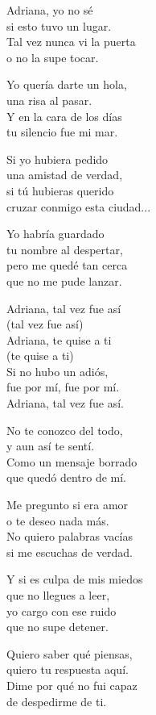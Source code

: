\begin{lyrics}
Adriana, yo no sé\\
si esto tuvo un lugar.\\
Tal vez nunca vi la puerta\\
o no la supe tocar.

Yo quería darte un hola,\\
una risa al pasar.\\
Y en la cara de los días\\
tu silencio fue mi mar.

Si yo hubiera pedido\\
una amistad de verdad,\\
si tú hubieras querido\\
cruzar conmigo esta ciudad...

Yo habría guardado\\
tu nombre al despertar,\\
pero me quedé tan cerca\\
que no me pude lanzar.

Adriana, tal vez fue así\\
(tal vez fue así)\\
Adriana, te quise a ti\\
(te quise a ti)\\
Si no hubo un adiós,\\
fue por mí, fue por mí.\\
Adriana, tal vez fue así.

No te conozco del todo,\\
y aun así te sentí.\\
Como un mensaje borrado\\
que quedó dentro de mí.

Me pregunto si era amor\\
o te deseo nada más.\\
No quiero palabras vacías\\
si me escuchas de verdad.

Y si es culpa de mis miedos\\
que no llegues a leer,\\
yo cargo con ese ruido\\
que no supe detener.

Quiero saber qué piensas,\\
quiero tu respuesta aquí.\\
Dime por qué no fui capaz\\
de despedirme de ti.


\end{lyrics}
